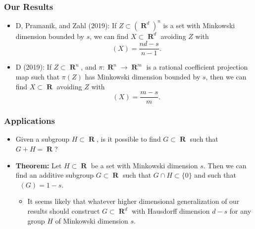 \documentclass[usenames,dvipsnames,handout]{beamer}
\DeclareMathOperator{\RR}{\textbf{R}}
\DeclareMathOperator{\hausdim}{\text{dim}_{\textbf{H}}}
\begin{document}
\begin{frame}
    \frametitle{Our Results}

    \begin{itemize}
        \item D, Pramanik, and Zahl (2019): If $Z \subset (\RR^d)^n$ is a set with Minkowski dimension bounded by $s$, we can find $X \subset \RR^d$ avoiding $Z$ with
        \[ \hausdim(X) = \frac{nd-s}{n-1}. \]

        \pause
        \item D (2019): If $Z \subset \RR^n$, and $\pi: \RR^n \to \RR^m$ is a rational coefficient projection map such that $\pi(Z)$ has Minkowski dimension bounded by $s$, then we can find $X \subset \RR$ avoiding $Z$ with
        \[ \hausdim(X) = \frac{m - s}{m}. \]
    \end{itemize}
\end{frame}





\begin{frame}
    \frametitle{Applications}

    \begin{itemize}
        \item Given a subgroup $H \subset \RR$, is it possible to find $G \subset \RR$ such that $G + H = \RR$?

        \pause
        \item \textbf{Theorem:} Let $H \subset \RR$ be a set with Minkowski dimension $s$. Then we can find an additive subgroup $G \subset \RR$ such that $G \cap H \subset \{ 0 \}$ and such that $\hausdim(G) = 1-s$.

        \begin{itemize}
            \item It seems likely that whatever higher dimensional generalization of our results should construct $G \subset \RR^d$ with Hausdorff dimension $d - s$ for any group $H$ of Minkowski dimension $s$.
        \end{itemize}
    \end{itemize}
\end{frame}
\end{document}
